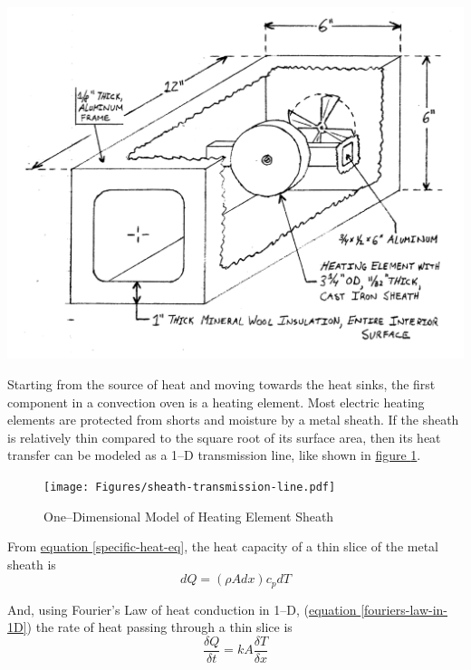 \documentclass[10pt, twocolumn]{article}
\begin{document}
\begin{center}
	\includegraphics[width=\columnwidth]{Figures/first-oven-concept.pdf}
	\label{first-oven-concept}
\end{center}

Starting from the source of heat and moving towards the heat sinks,
the first component in a convection oven is a heating element.
Most electric heating elements are protected from shorts and moisture
by a metal sheath.
If the sheath is relatively thin compared to the square root of its surface area,
then its heat transfer can be modeled as a 1--D transmission line, like shown in
\hyperref[sheath-transmission-line]{figure \ref{sheath-transmission-line}}.

\begin{figure}
\centering
\texttt{[image: Figures/sheath-transmission-line.pdf]}
\caption{One--Dimensional Model of Heating Element Sheath}
\label{sheath-transmission-line}
\end{figure}

From \hyperref[specific-heat-eq]{equation \ref{specific-heat-eq}},
the heat capacity of a thin slice of the metal sheath is
\begin{equation*}
dQ=(\rho A dx)c_{p}dT
\end{equation*}

And, using Fourier's Law of heat conduction in 1--D,
(\hyperref[fouriers-law-in-1D]{equation \ref{fouriers-law-in-1D}})
the rate of heat passing through a thin slice is
\begin{equation*}
\frac{\delta Q}{\delta t}=kA\frac{\delta T}{\delta x}
\end{equation*} 
 
\end{document}

